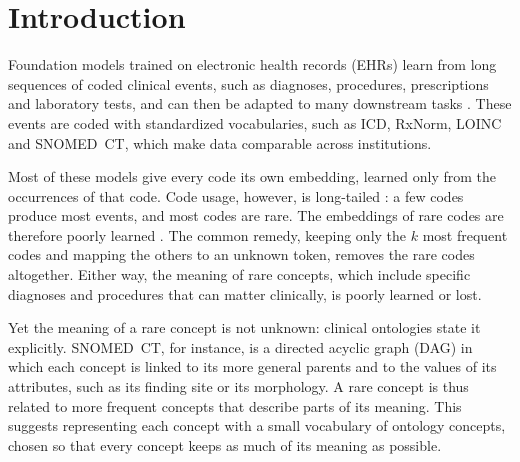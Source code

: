 \section{Introduction}
\label{sec:introduction}

Foundation models trained on electronic health records (EHRs) learn from long sequences of coded clinical events, such as diagnoses, procedures, prescriptions and laboratory tests, and can then be adapted to many downstream tasks \cite{li2020behrt, yang2023transformehr}.
These events are coded with standardized vocabularies, such as ICD, RxNorm, LOINC and SNOMED~CT, which make data comparable across institutions.

Most of these models give every code its own embedding, learned only from the occurrences of that code.
Code usage, however, is long-tailed \cite{zhang2023longtailed}: a few codes produce most events, and most codes are rare.
The embeddings of rare codes are therefore poorly learned \cite{gowda2020finding, land2024fishing}.
The common remedy, keeping only the $k$ most frequent codes and mapping the others to an unknown token, removes the rare codes altogether.
Either way, the meaning of rare concepts, which include specific diagnoses and procedures that can matter clinically, is poorly learned or lost.

Yet the meaning of a rare concept is not unknown: clinical ontologies state it explicitly.
SNOMED~CT, for instance, is a directed acyclic graph (DAG) in which each concept is linked to its more general parents and to the values of its attributes, such as its finding site or its morphology.
A rare concept is thus related to more frequent concepts that describe parts of its meaning.
This suggests representing each concept with a small vocabulary of ontology concepts, chosen so that every concept keeps as much of its meaning as possible.

